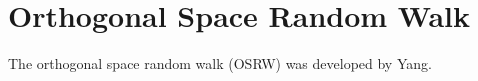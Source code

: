 \section{Orthogonal Space Random Walk\label{Sec:ES:OSRW}}
The orthogonal space random walk (OSRW) was developed by Yang.\cite{ZhengPNAS2008}
